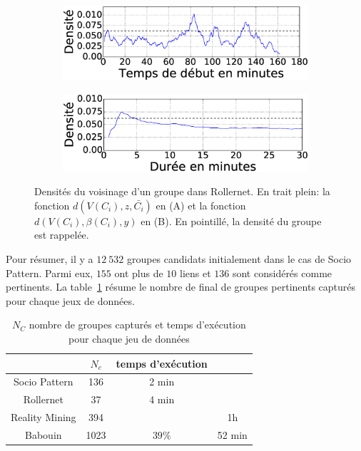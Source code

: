 \begin{figure}
\centering
\begin{subfigure}{0.45\linewidth}
	\includegraphics[width=\linewidth]{img/GroupeDense/GroupExample/Rollernet/vairable_start7}
	\caption{}
	\label{fig:g7_debut}
\end{subfigure}
\begin{subfigure}{0.45\linewidth}
	\includegraphics[width=\linewidth]{img/GroupeDense/GroupExample/Rollernet/vairable_duration7}
	\caption{}
	\label{fig:g7_duree}
\end{subfigure}
\caption{
Densités du voisinage d'un groupe dans Rollernet.
En trait plein: la fonction $d(V(C_i),z,\bar{C_i})$ en (A) et la fonction  $d(V(C_i),\beta(C_i),y)$ en (B).
En pointillé, la densité du groupe est rappelée.
}
\label{fig:Rollernet_exemple}
\end{figure}





\bigskip
Pour résumer, il y a $12\ 532$  groupes candidats initialement dans le cas de Socio Pattern.
Parmi eux, $155$ ont plus de $10$ liens et $136$ sont considérés comme pertinents.
La table~\ref{tab:res_exec} résume le nombre de final de groupes pertinents capturés pour chaque jeux de données.


\begin{table}
\centering
\begin{tabular}{|c|c|c|c|}
\hline \rule[-1ex]{0pt}{3.5ex}
 & $N_c$ & temps d'exécution \\
\hline
Socio Pattern & 136 &  2 min \\
Rollernet& 37 &  4 min \\
Reality Mining & 394 & & 1h \\
Babouin & 1023 & $39\%$ & 52 min\\
\hline
\end{tabular}
\caption{$N_C$ nombre de groupes capturés et temps d'exécution pour chaque jeu de données}
\label{tab:res_exec}       %
\end{table}


